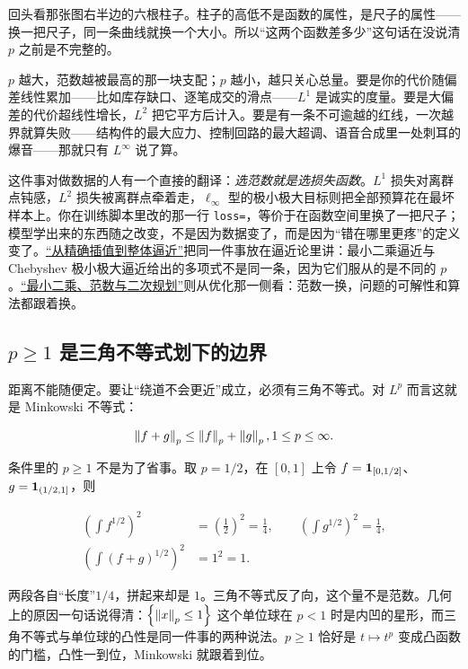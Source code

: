 回头看那张图右半边的六根柱子。柱子的高低不是函数的属性，是尺子的属性——换一把尺子，同一条曲线就换一个大小。所以``这两个函数差多少''这句话在没说清 \(p\) 之前是不完整的。

\(p\) 越大，范数越被最高的那一块支配；\(p\) 越小，越只关心总量。要是你的代价随偏差线性累加——比如库存缺口、逐笔成交的滑点——\(L^1\) 是诚实的度量。要是大偏差的代价超线性增长，\(L^2\) 把它平方后计入。要是有一条不可逾越的红线，一次越界就算失败——结构件的最大应力、控制回路的最大超调、语音合成里一处刺耳的爆音——那就只有 \(L^\infty\) 说了算。

这件事对做数据的人有一个直接的翻译：\emph{选范数就是选损失函数}。\(L^1\) 损失对离群点钝感，\(L^2\) 损失被离群点牵着走，\(\ell_\infty\) 型的极小极大目标则把全部预算花在最坏样本上。你在训练脚本里改的那一行 \texttt{loss=}，等价于在函数空间里换了一把尺子；模型学出来的东西随之改变，不是因为数据变了，而是因为``错在哪里更疼''的定义变了。\hyperref[sec:08-Numerical-Analysis/03-Interpolation-and-Approximation/03]{``从精确插值到整体逼近''}把同一件事放在逼近论里讲：最小二乘逼近与 Chebyshev 极小极大逼近给出的多项式不是同一条，因为它们服从的是不同的 \(p\)。\hyperref[sec:09-Convex-Optimization/04-Convex-Problems/02]{``最小二乘、范数与二次规划''}则从优化那一侧看：范数一换，问题的可解性和算法都跟着换。

\subsection{\texorpdfstring{\(p\ge1\) 是三角不等式划下的边界}{p>=1 是三角不等式划下的边界}}

距离不能随便定。要让``绕道不会更近''成立，必须有三角不等式。对 \(L^p\) 而言这就是 Minkowski 不等式：

\[
\left\lVert f+g\right\rVert_p\le\left\lVert f\right\rVert_p+\left\lVert g\right\rVert_p,\space 1\le p\le\infty .
\]

条件里的 \(p\ge1\) 不是为了省事。取 \(p=1/2\)，在 \([0,1]\) 上令 \(f=\mathbf{1}_{[0,1/2]}\)、\(g=\mathbf{1}_{(1/2,1]}\)，则

\[
\begin{aligned}
\left(\int f^{1/2}\right)^{2}&=\left(\tfrac12\right)^{2}=\tfrac14,\qquad
\left(\int g^{1/2}\right)^{2}=\tfrac14,\\
\left(\int (f+g)^{1/2}\right)^{2}&=1^{2}=1 .
\end{aligned}
\]

两段各自``长度''\(1/4\)，拼起来却是 \(1\)。三角不等式反了向，这个量不是范数。几何上的原因一句话说得清：\(\left\{\left\lVert x\right\rVert_p\le1\right\}\) 这个单位球在 \(p<1\) 时是内凹的星形，而三角不等式与单位球的凸性是同一件事的两种说法。\(p\ge1\) 恰好是 \(t\mapsto t^p\) 变成凸函数的门槛，凸性一到位，Minkowski 就跟着到位。

